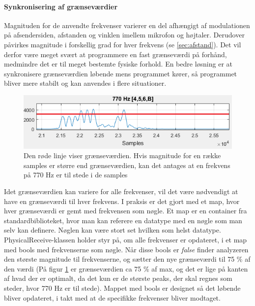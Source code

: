 \paragraph{Synkronisering af grænseværdier}\hfill \break

Magnituden for de anvendte frekvenser varierer en del afhængigt af modulationen på afsendersiden, afstanden og vinklen imellem mikrofon og højtaler. Derudover påvirkes magnitude i forskellig grad for hver frekvens (se \ref{sec:afstand}). Det vil derfor være meget svært at programmere en fast grænseværdi på forhånd, medmindre det er til meget bestemte fysiske forhold. En bedre løsning er at synkronisere grænseværdien løbende mens programmet kører, så programmet bliver mere stabilt og kan anvendes i flere situationer.

\begin{figure}[h!]
\centering
\includegraphics[scale=0.7]{Billeder/Threshold.PNG}
\caption{Den røde linje viser grænseværdien. Hvis magnitude for en række samples er større end grænseværdien, kan det antages at en frekvens på 770 Hz er til stede i de samples}
\label{fig:threshold}
\end{figure}

Idet grænseværdien kan variere for alle frekvenser, vil det være nødvendigt at have en grænseværdi til hver frekvens. I praksis er det gjort med et map, hvor hver grænseværdi er gemt med frekvensen som nøgle. Et map er en container fra standardbiblioteket, hvor man kan referere en datatype med en nøgle som man selv kan definere. Nøglen kan være stort set hvilken som helst datatype. PhysicalReceive-klassen holder styr på, om alle frekvenser er opdateret, i et map med bools med frekvenserne som nøgle. Når disse bools er \textit{false} finder analyzeren den største magnitude til frekvenserne, og sætter den nye grænseværdi til 75 \% af den værdi (På figur \ref{fig:threshold} er grænseværdien ca 75 \% af max, og det er lige på kanten af hvad der er optimalt, da det kun er de største peaks, der skal regnes som steder, hvor 770 Hz er til stede). Mappet med bools er designet så det løbende bliver opdateret, i takt med at de specifikke frekvenser bliver modtaget. 

